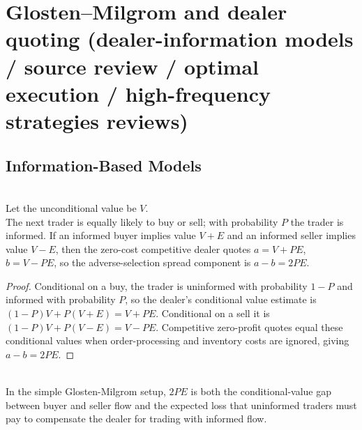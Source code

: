 \documentclass[a4paper,oneside,openany]{book}
\begin{document}
\section*{Glosten--Milgrom and dealer quoting (dealer-information models / source review / optimal execution / high-frequency strategies reviews)}

\subsection*{Information-Based Models}

\begin{proposition} \\
Let the unconditional value be $V$.\\
The next trader is equally likely to buy or sell; with probability $P$ the trader is informed. If an informed buyer implies value $V+E$ and an informed seller implies value $V-E$, then the zero-cost competitive dealer quotes $a=V+PE$, $b=V-PE$, so the adverse-selection spread component is $a-b=2PE$.
\begin{proof}
Conditional on a buy, the trader is uninformed with probability $1-P$ and informed with probability $P$, so the dealer's conditional value estimate is $(1-P)V+P(V+E)=V+PE$. Conditional on a sell it is $(1-P)V+P(V-E)=V-PE$. Competitive zero-profit quotes equal these conditional values when order-processing and inventory costs are ignored, giving $a-b=2PE$.
\end{proof}
\end{proposition}

\begin{principle} \\
In the simple Glosten-Milgrom setup, $2PE$ is both the conditional-value gap between buyer and seller flow and the expected loss that uninformed traders must pay to compensate the dealer for trading with informed flow.
\end{principle}
\end{document}
